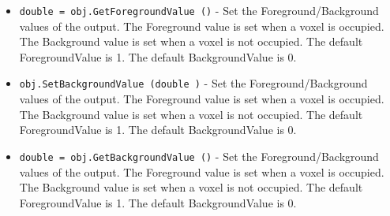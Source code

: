 \begin{itemize}
\item  \verb|double = obj.GetForegroundValue ()| -  Set the Foreground/Background values of the output. The
 Foreground value is set when a voxel is occupied. The Background
 value is set when a voxel is not occupied.
 The default ForegroundValue is 1. The default BackgroundValue is
 0.

\item  \verb|obj.SetBackgroundValue (double )| -  Set the Foreground/Background values of the output. The
 Foreground value is set when a voxel is occupied. The Background
 value is set when a voxel is not occupied.
 The default ForegroundValue is 1. The default BackgroundValue is
 0.

\item  \verb|double = obj.GetBackgroundValue ()| -  Set the Foreground/Background values of the output. The
 Foreground value is set when a voxel is occupied. The Background
 value is set when a voxel is not occupied.
 The default ForegroundValue is 1. The default BackgroundValue is
 0.

\end{itemize}
